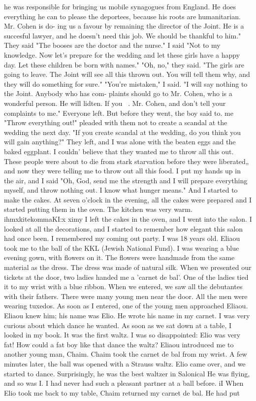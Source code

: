 he was responsible for bringing us mobile synagogues from England. He does everything 
he can to please the deportees, because his roots are humanitarian. Mr. Cohen is do-
ing us a favour by remaining the director of the Joint. He is a succesful lawyer, and 
he doesn't need this job. We should be thankful to him." 
They said "The booses are the doctor and the nurse." 
I said "Not to my knowledge. Now let's prepare for the wedding and let these girls 
have a happy day. Let these children be born with names." 
"Oh, no," they said. "The girls are going to leave. The Joint will see all this 
thrown out. You will tell them why, and they will do something for sure." 
"You're mistaken," I said. "I will say nothing to the Joint. Anybody who has com-
plaints should go to Mr. Cohen, who is a wonderful person. He will lidten. If you 
~. 
Mr. Cohen, and don't tell your complaints to me." 
Everyone left. But before they went, the boy said to. me "Throw everything out!" 
pleaded with them not to create a scandal at the wedding the next day. "If you create 
scandal at the wedding, do you think you will gain anything?" 
They left, and I was alone with the beaten eggs and the baked eggplant. I couldn' 
believe that they wanted me to throw all this out. These people were about to die from 
stark starvation before they were liberated„ and now they were telling me to throw out 
all this food. 
I put my hands up in the air, and I said "Oh, God, send me the strength and I will 
prepare everything myself, and throw nothing out. I know what hunger means." And I 
started to make the cakes. At seven o'clock in the evening, all the cakes were prepared 
and I started putting them in the oven. The kitchen was very warm. ihmxkitekommaKI:x 
ximy I left the cakes in the oven, and I went into the salon. I looked at all the 
decorations, and I started to remember how elegant this salon had once been. 
I remembered my coming out party. I was 18 years old. Eliaou took me to the ball 
of the KKL (Jewish National Fund). I was wearing a blue evening gown, with flowers on 
it. The flowers were handmade from the same material as the dress. The dress was made 
of natural silk. When we presented our tickets at the door, two ladies handed me a 
'carnet de bal'. One of the ladies tied it to my wrist with a blue ribbon. When we 
entered, we saw all the debutantes with their fathers. There were many young men near 
the door. All the men were wearing tuxedos. 
As soon as I entered, one of the young men approached Eliaou. Eliaou knew him; 
his name was Elio. He wrote his name in my carnet. I was very curious about which 
dance he wanted. As soon as we sat down at a table, I looked in my book. It was the 
first waltz. I was so disappointed: Elio was very fat! How could a fat boy like that 
dance the waltz? 
Eliaou introduced me to another young man, Chaim. Chaim took the carnet de bal 
from my wrist. A few minutes later, the ball was opened with a Strauss waltz. Elio 
came over, and we started to dance. Surprisingly, he was the best waltzer in Salonical 
He was flying, and so was I. I had never had such a pleasant partner at a ball before. iI 
When Elio took me back to my table, Chaim returned my carnet de bal. He had put 